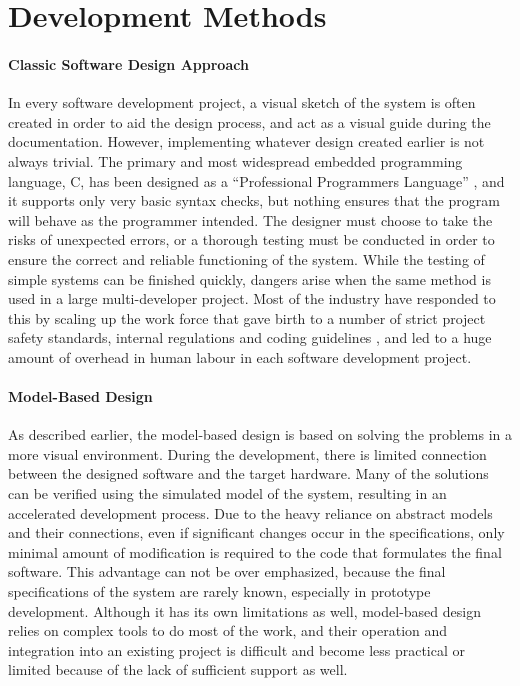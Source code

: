 \section{Development Methods}

\paragraph{Classic Software Design Approach}

In every software development project, a visual sketch of the system is often created in order to aid the design process, and act as a visual guide during the documentation. However, implementing whatever design created earlier is not always trivial. The primary and most widespread embedded programming language, \textsf{C}, has been designed as a “Professional Programmers Language” \cite{essentialc}, and it supports only very basic syntax checks, but nothing ensures that the program will behave as the programmer intended. The designer must choose to take the risks of unexpected errors, or a thorough testing must be conducted in order to ensure the correct and reliable functioning of the system. While the testing of simple systems can be finished quickly, dangers arise when the same method is used in a large multi-developer project. Most of the industry have responded to this by scaling up the work force that gave birth to a number of strict project safety standards, internal regulations and coding guidelines \cite{misra}, and led to a huge amount of overhead in human labour in each software development project.

\paragraph{Model-Based Design}

As described earlier, the model-based design is based on solving the problems in a more visual environment. During the development, there is  limited connection between the designed software and the target hardware. Many of the solutions can be verified using the simulated model of the system, resulting in an accelerated development process\cite{locomotive}.
Due to the heavy reliance on abstract models and their connections, even if significant changes occur in the specifications, only minimal amount of modification is required to the code that formulates the final software. This advantage can not be over emphasized, because the final specifications of the system are rarely known, especially in prototype development.
Although it has its own limitations as well, model-based design relies on complex tools to do most of the work, and their operation and integration into an existing project is difficult and become less practical or limited because of the lack of sufficient support as well.

